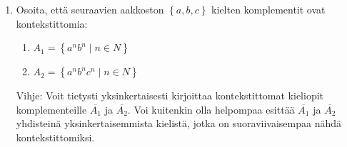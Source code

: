 \documentclass[a4paper,11pt]{article}
\newcommand{\set}[1]{{\left\{ #1 \right\}}}
\begin{document}
\begin{enumerate}

\item
Osoita, että seuraavien aakkoston $\set{a,b,c}$ kielten komplementit ovat kontekstittomia:
\begin{enumerate}
\item $A_1=\set{ a^n b^n \mid n \in N}$
\item $A_2=\set{ a^n b^n c^n\mid n \in N}$
\end{enumerate}

Vihje: Voit tietysti yksinkertaisesti kirjoittaa kontekstittomat  kieliopit komplementeille $\overline{A_1}$ ja $\overline{A_2}$. Voi kuitenkin
olla helpompaa esittää $\overline{A_1}$ ja $\overline{A_2}$ yhdisteinä yksinkertaisemmista kielistä, jotka on suoraviivaisempaa
nähdä kontekstittomiksi.

%





\end{enumerate}
\end{document}
